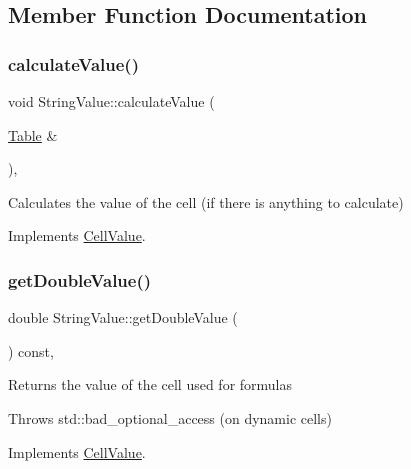 \subsection{Member Function Documentation}
\mbox{\label{classStringValue_a36936ad0f3beac2f197192fba48d8580}} 
\subsubsection{\texorpdfstring{calculate\+Value()}{calculateValue()}}
{\footnotesize\ttfamily void String\+Value\+::calculate\+Value (\begin{DoxyParamCaption}\item[{\hyperlink{classTable}{Table} \&}]{ }\end{DoxyParamCaption})\hspace{0.3cm}{\ttfamily [override]}, {\ttfamily [virtual]}}

Calculates the value of the cell (if there is anything to calculate) 

Implements \hyperlink{classCellValue_ab644256decf3608ed50e389ead6cf611}{Cell\+Value}.

\mbox{\label{classStringValue_a22bcc6ee544f8ad6e91ddb31a936bf66}} 
\subsubsection{\texorpdfstring{get\+Double\+Value()}{getDoubleValue()}}
{\footnotesize\ttfamily double String\+Value\+::get\+Double\+Value (\begin{DoxyParamCaption}{ }\end{DoxyParamCaption}) const\hspace{0.3cm}{\ttfamily [override]}, {\ttfamily [virtual]}}

Returns the value of the cell used for formulas

Throws std\+::bad\+\_\+optional\+\_\+access (on dynamic cells) 

Implements \hyperlink{classCellValue_a3d2850b3a8473050fd46f486a29ed5bf}{Cell\+Value}.

\mbox{\label{classStringValue_a4c411db1254d987504a6014e296dd565}} 
